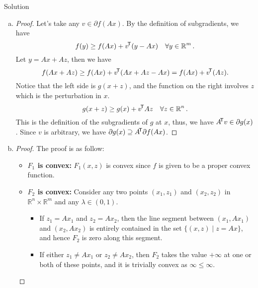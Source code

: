 \documentclass{article}
\begin{document}
\begin{solution}
    {Solution}
    \begin{enumerate}[(a)]
        \item {
            \begin{proof}
                Let's take any $v\in\partial f(Ax)$. By the definition of subgradients, we have
                \[
                    f(y)\geq f(Ax)+v\!^{\mathsf{T}}(y-Ax) \quad \forall y\in\operatorname{\mathbb{R}}^m.
                \]
                Let $y=Ax+Az$, then we have
                \[
                    f(Ax+Az)\geq f(Ax)+v\!^{\mathsf{T}}(Ax+Az-Ax)=f(Ax)+v\!^{\mathsf{T}}(Az).
                \]
                Notice that the left side is $g(x+z)$, and the function on the right involves $z$ which is the perturbation in $x$.
                \[
                    g(x+z)\geq g(x)+v\!^{\mathsf{T}} Az \quad \forall z\in\operatorname{\mathbb{R}}^n.
                \]
                This is the definition of the subgradients of $g$ at $x$, thus, we have $A\!^{\mathsf{T}} v\in\partial g(x)$. Since $v$ is arbitrary, we have $\partial g(x)\supseteq A\!^{\mathsf{T}}\partial f(Ax)$.
            \end{proof}
        }
        \item {
            \begin{proof}
                The proof is as follow:
                \begin{itemize}
                    \item \textbf{\( F_1 \) is convex:}
                    \( F_1(x,z) \) is convex since \( f \) is given to be a proper convex function.

                    \item \textbf{\( F_2 \) is convex:}
                    Consider any two points \( (x_1, z_1) \) and \( (x_2, z_2) \) in \( \mathbb{R}^n \times \mathbb{R}^m \) and any \( \lambda \in (0,1) \).
                    \begin{itemize}
                        \item If \( z_1 = Ax_1 \) and \( z_2 = Ax_2 \), then the line segment between \( (x_1, Ax_1) \) and \( (x_2, Ax_2) \) is entirely contained in the set \( \{ (x,z) \mid z = Ax \} \), and hence \( F_2 \) is zero along this segment.

                        \item If either \( z_1 \neq Ax_1 \) or \( z_2 \neq Ax_2 \), then \( F_2 \) takes the value \( +\infty \) at one or both of these points, and it is trivially convex as \( \infty \leq \infty \).
                    \end{itemize}


\end{itemize}
\end{proof}}
\end{enumerate}
\end{solution}
\end{document}

